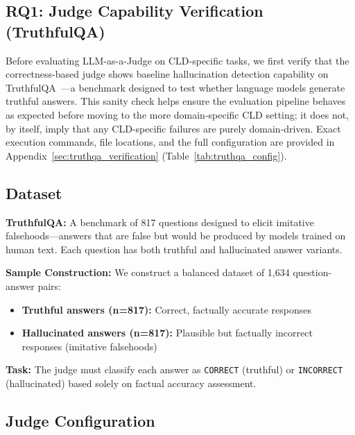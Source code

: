 \subsection{RQ1: Judge Capability Verification (TruthfulQA)}

Before evaluating LLM-as-a-Judge on CLD-specific tasks, we first verify that the correctness-based judge shows baseline hallucination detection capability on TruthfulQA~\cite{lin2022truthfulqa}---a benchmark designed to test whether language models generate truthful answers. This sanity check helps ensure the evaluation pipeline behaves as expected before moving to the more domain-specific CLD setting; it does not, by itself, imply that any CLD-specific failures are purely domain-driven.
Exact execution commands, file locations, and the full configuration are provided in Appendix~\ref{sec:truthqa_verification} (Table~\ref{tab:truthqa_config}).

\subsection{Dataset}

\textbf{TruthfulQA:} A benchmark of 817 questions designed to elicit imitative falsehoods---answers that are false but would be produced by models trained on human text. Each question has both truthful and hallucinated answer variants.

\textbf{Sample Construction:} We construct a balanced dataset of 1,634 question-answer pairs:
\begin{itemize}[noitemsep]
    \item \textbf{Truthful answers (n=817):} Correct, factually accurate responses
    \item \textbf{Hallucinated answers (n=817):} Plausible but factually incorrect responses (imitative falsehoods)
\end{itemize}

\textbf{Task:} The judge must classify each answer as \texttt{CORRECT} (truthful) or \texttt{INCORRECT} (hallucinated) based solely on factual accuracy assessment.

\subsection{Judge Configuration}

